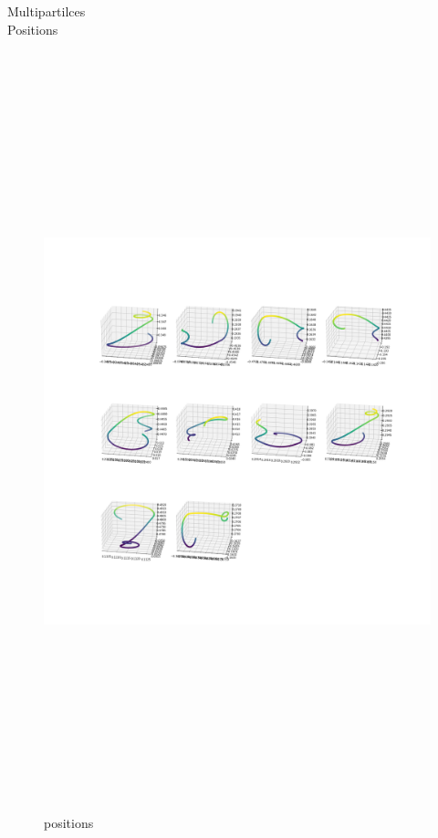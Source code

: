 \documentclass[12pt]{article}
\begin{document}
	Multipartilces\\
	Positions
	\begin{figure}[H]
		\includegraphics[width=\linewidth, height=22cm]{subps3.png} \caption{positions} \label{subps3}
	\end{figure}
\end{document}
